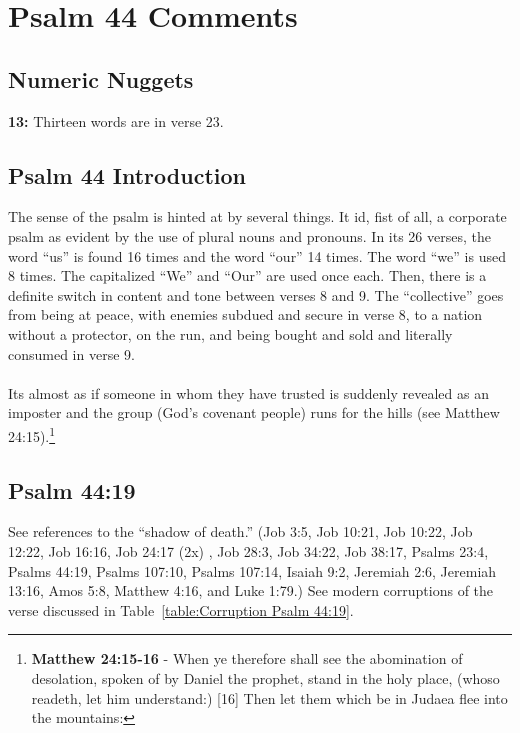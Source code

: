 \section{Psalm 44 Comments}

\subsection{Numeric Nuggets}
\textbf{13: } Thirteen words are in verse 23.

\subsection{Psalm 44 Introduction}
The sense of the psalm is hinted at by several things.  It id, fist of all, a corporate psalm as evident by the use of plural nouns and pronouns. In its 26 verses, the word ``us'' is found 16 times and the word ``our'' 14 times. The word ``we'' is used 8 times. The capitalized ``We'' and ``Our'' are used once each. Then, there is a definite switch in content and tone between verses 8 and 9.  The ``collective'' goes from being at peace, with enemies subdued and secure in verse 8, to a  nation without a protector, on the run, and being bought and sold and literally consumed in verse 9.\\
\\
\noindent Its almost as if someone in whom they have trusted is suddenly revealed as an imposter and the group (God's covenant people) runs for the hills (see  Matthew 24:15).\footnote{\textbf{Matthew 24:15-16} -  \textcolor[cmyk]{0, 0.85. 0.70. 0.23}{When ye therefore shall see the abomination of desolation, spoken of by Daniel the prophet, stand in the holy place, (whoso readeth, let him understand:)} [16]  \textcolor[cmyk]{0, 0.85. 0.70. 0.23}{Then let them which be in Judaea flee into the mountains:} }

\subsection{Psalm 44:19}
See references to the ``shadow of death.'' (Job 3:5, Job 10:21, Job 10:22, Job 12:22, Job 16:16, Job 24:17 (2x) , Job 28:3, Job 34:22, Job 38:17, Psalms 23:4, Psalms 44:19, Psalms 107:10, Psalms 107:14,  Isaiah 9:2, Jeremiah 2:6, Jeremiah 13:16, Amos 5:8, Matthew 4:16, and Luke 1:79.) See modern corruptions of the verse discussed in Table~\ref{table:Corruption Psalm 44:19}.





